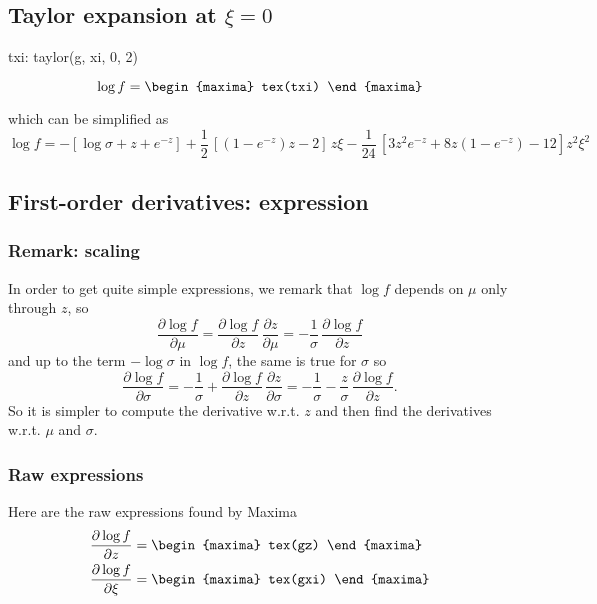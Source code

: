 \subsection{Taylor expansion at $\xi = 0$}

\begin{maxima}
  txi: taylor(g, xi, 0, 2)
\end{maxima}
{\color{MonVertF}
\[
  \log f = 
  \begin{maxima}
    tex(txi)
  \end{maxima}
\]
}

which can be simplified as
{\color{red}
$$
\log f = -\left[ \log \sigma + z + e^{-z} \right] + \frac{1}{2}\,
\left[ (1 -  e^{-z}) z -2  \right]\,z \xi - \frac{1}{24} \,
\left[ 3 z^2 e^{-z} + 8 z (1 - e^{-z}) - 12 \right] z^2 \xi^2
$$}

\subsection{First-order derivatives: expression}

\subsubsection*{Remark: scaling}
In order to get quite simple expressions, we remark that $\log f$
depends on $\mu$ only through $z$, so
$$
\frac{\partial \log f}{\partial \mu} = \frac{\partial \log f}{\partial z} \,
   \dfrac{\partial z}{\partial \mu} = -\frac{1}{\sigma} \, \frac{\partial \log f}{\partial z}
$$ 
and up to the term $-\log \sigma$ in $\log f$, the same is true for
$\sigma$ so
$$
\frac{\partial \log f}{\partial \sigma} =
-\frac{1}{\sigma} + \frac{\partial \log f}{\partial z} \, \dfrac{\partial z}{\partial \sigma} =
-\frac{1}{\sigma} -\frac{z}{\sigma} \, \frac{\partial \log f}{\partial z}.
$$ 
So it is simpler to compute the derivative w.r.t. $z$ and then find the
derivatives w.r.t. $\mu$ and $\sigma$.

\subsubsection*{Raw expressions}
Here are the raw expressions found by Maxima
{\color{MonVertF}
  \begin{align*}
  \frac{\partial \log f}{\partial z}
  &=
    \begin{maxima}
      tex(gz)
    \end{maxima}
  \\
  \frac{\partial \log f}{\partial \xi}
  &=
    \begin{maxima}
      tex(gxi)
    \end{maxima}
  \end{align*}
}

